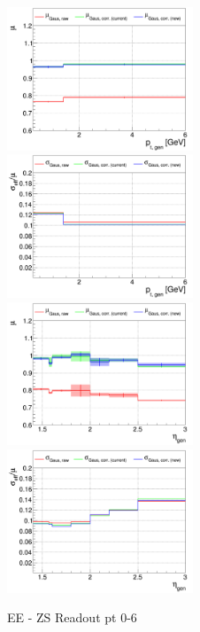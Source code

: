 \begin{figure}
\includegraphics[width=0.495\textwidth]{./plots_pdf/ECAL_plots/plotsPU/EE/ZS/pdf/GENPT/EEZS_GENPT_0000_0006_MuOverBins.pdf}
\includegraphics[width=0.495\textwidth]{./plots_pdf/ECAL_plots/plotsPU/EE/ZS/pdf/GENPT/EEZS_GENPT_0000_0006_EffSigmaOverBins.pdf}
\includegraphics[width=0.495\textwidth]{./plots_pdf/ECAL_plots/plotsPU/EE/ZS/pdf/GENETA/EEZS_GENETA_0000_0006_MuOverBins.pdf}
\includegraphics[width=0.495\textwidth]{./plots_pdf/ECAL_plots/plotsPU/EE/ZS/pdf/GENETA/EEZS_GENETA_0000_0006_EffSigmaOverBins.pdf}
\caption{EE - ZS Readout pt 0-6}
\end{figure}

